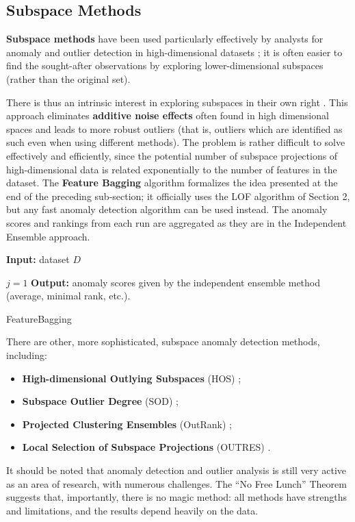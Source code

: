 %
\subsection{Subspace Methods}
%
%
\textbf{Subspace methods} have been used particularly effectively by analysts for anomaly and outlier detection in high-dimen\-sional datasets \cite{A8,A13,A14}; it is often easier to find the sought-after observations by exploring  lower-dimensional subspaces (rather than the original set). \par There is thus an intrinsic interest in exploring subspaces in their own right  \cite{A1,Aurore}. This approach eliminates \textbf{additive noise effects} often found in high dimensional spaces and leads to more robust outliers (that is, outliers which are identified as such even when using different methods). \newl The problem is rather difficult to solve effectively and efficiently, since the potential number of subspace projections of high-dimensional data is related exponentially to the number of features in the dataset. \newl The \textbf{Feature Bagging} algorithm formalizes the idea presented at the end of the preceding sub-section; it officially uses the LOF algorithm of Section 2, but any fast anomaly detection algorithm can be used instead. The anomaly scores and rankings from each run are aggregated as they are in the Independent Ensemble approach. 

\begin{algorithm}
\SetAlgoLined
\textbf{Input:} dataset $D$

$j=1$\;
\textbf{Output:} anomaly scores given by the independent ensemble method (average, minimal rank, etc.).
\caption{FeatureBagging}
\end{algorithm}
\noindent There are other, more sophisticated, subspace anomaly detection methods, including:
\begin{itemize}[noitemsep]
\item \textbf{High-dimensional Outlying Subspaces} (HOS) \cite{Zhang}; \item \textbf{Subspace Outlier Degree} (SOD) \cite{Zi};%
\item \textbf{Projected Clustering Ensembles} (OutRank) \cite{M1}; 
\item \textbf{Local Selection of Subspace Projections} (OUTRES) \cite{M3}.
\end{itemize}
It should be noted that anomaly detection and outlier analysis is still very active as an area of research, with numerous challenges. The ``No Free Lunch'' Theorem suggests that, importantly, there is no magic method: all methods have strengths and limitations, and the results depend heavily on the data. 
\afterpage{\FloatBarrier}
